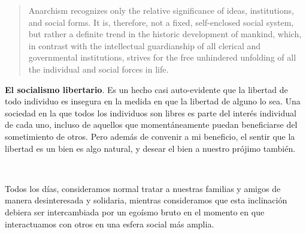 \documentclass[a4paper, 12pt]{article}
\begin{document}
\begin{quote}
Anarchism recognizes only the relative significance of
ideas, institutions, and social forms. It is, therefore,
not a fixed, self-enclosed social system, but rather a
definite trend in the historic development of mankind,
which, in contrast with the intellectual guardianship of
all clerical and governmental institutions, strives for the
free unhindered unfolding of all the individual and social
forces in life. 
\end{quote}

\textbf{El socialismo libertario}. Es un hecho casi auto-evidente que la
libertad de todo individuo es insegura en la medida en que la libertad de alguno
lo sea. Una sociedad en la que todos los individuos son libres es parte del
interés individual de cada uno, incluso de aquellos que momentáneamente puedan
beneficiarse del sometimiento de otros. Pero además de convenir a mi beneficio,
el sentir que la libertad es un bien es algo natural, y desear el bien a nuestro
prójimo también. 

~

Todos los días, consideramos normal tratar a nuestras familias y amigos de
manera desinteresada y solidaria, mientras consideramos que esta inclinación
debiera ser intercambiada por un egoísmo bruto en el momento en que
interactuamos con otros en una esfera social más amplia. 
\end{document}
